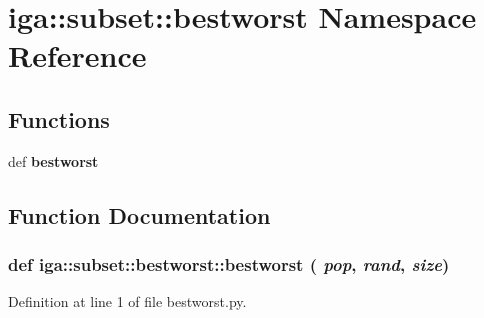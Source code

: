 \section{iga::subset::bestworst Namespace Reference}
\label{namespaceiga_1_1subset_1_1bestworst}


\subsection*{Functions}
\begin{CompactItemize}
\item 
def {\bf bestworst}
\end{CompactItemize}


\subsection{Function Documentation}
\subsubsection{\setlength{\rightskip}{0pt plus 5cm}def iga::subset::bestworst::bestworst ( {\em pop},  {\em rand},  {\em size})}\label{namespaceiga_1_1subset_1_1bestworst_ce9d7075297b2a27d1cee9b8fd00e69a}




Definition at line 1 of file bestworst.py.